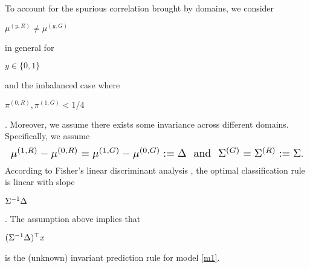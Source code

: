 To account for the spurious correlation brought by domains, we consider \begin{small}$\mu^{(y,R)}\neq \mu^{(y,G)}$\end{small} in general for \begin{small}$y\in\{0,1\}$\end{small} and the imbalanced case where \begin{small}$\pi^{(0,R)}, \pi^{(1,G)}<1/4$\end{small}. Moreover, we assume there exists some invariance across different domains. Specifically, we assume 
\begin{equation*}
   \resizebox{\hsize}{!}{$\mu^{(1,R)}-\mu^{(0,R)}= \mu^{(1,G)}-\mu^{(0,G)}:=\Delta~~\text{and}~~\Sigma^{(G)}=\Sigma^{(R)}:=\Sigma$}.
\end{equation*}
According to Fisher's linear discriminant analysis \citep{anderson1962introduction,tony2019high,cai2021convex}, the optimal classification rule is linear with slope \begin{small}$\Sigma^{-1}\Delta$\end{small}. The assumption above implies that \begin{small}$(\Sigma^{-1}\Delta)^\top x$\end{small} is the (unknown) invariant prediction rule for model \eqref{m1}. 

